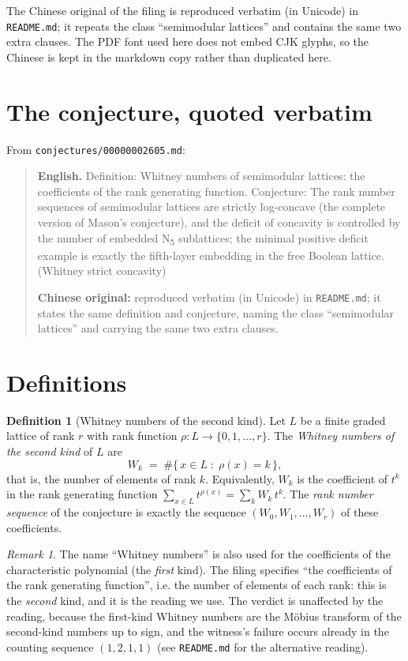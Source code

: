 \documentclass[11pt]{article}
\theoremstyle{definition}
\newtheorem{definition}[theorem]{Definition}
\theoremstyle{remark}
\newtheorem{remark}[theorem]{Remark}
\begin{document}
The Chinese original of the filing is reproduced verbatim (in Unicode) in
\texttt{README.md}; it repeats the class ``semimodular lattices'' and contains
the same two extra clauses. The PDF font used here does not embed CJK glyphs,
so the Chinese is kept in the markdown copy rather than duplicated here.

\section{The conjecture, quoted verbatim}

From \texttt{conjectures/00000002605.md}:

\begin{quote}
\textbf{English.} Definition: Whitney numbers of semimodular lattices: the
coefficients of the rank generating function. Conjecture: The rank number
sequences of semimodular lattices are strictly log-concave (the complete version
of Mason's conjecture), and the deficit of concavity is controlled by the number
of embedded N\textsubscript{5} sublattices; the minimal positive deficit example
is exactly the fifth-layer embedding in the free Boolean lattice.
(Whitney strict concavity)

\textbf{Chinese original:} reproduced verbatim (in Unicode) in
\texttt{README.md}; it states the same definition and conjecture, naming the
class ``semimodular lattices'' and carrying the same two extra clauses.
\end{quote}

\section{Definitions}

\begin{definition}[Whitney numbers of the second kind]\label{def:whitney}
Let $L$ be a finite graded lattice of rank $r$ with rank function
$\rho\colon L \to \{0,1,\dots,r\}$. The \emph{Whitney numbers of the second
kind} of $L$ are
\[
W_k \;=\; \#\{\, x \in L \;:\; \rho(x) = k \,\},
\]
that is, the number of elements of rank $k$. Equivalently, $W_k$ is the
coefficient of $t^k$ in the rank generating function
$\sum_{x\in L} t^{\rho(x)} = \sum_{k} W_k\, t^k$. The \emph{rank number
sequence} of the conjecture is exactly the sequence $(W_0,W_1,\dots,W_r)$ of
these coefficients.
\end{definition}

\begin{remark}
The name ``Whitney numbers'' is also used for the coefficients of the
characteristic polynomial (the \emph{first} kind). The filing specifies
``the coefficients of the rank generating function'', i.e. the number of
elements of each rank: this is the \emph{second} kind, and it is the reading we
use. The verdict is unaffected by the reading, because the first-kind Whitney
numbers are the M\"obius transform of the second-kind numbers up to sign, and the
witness's failure occurs already in the counting sequence
$(1,2,1,1)$ (see \texttt{README.md} for the alternative reading).
\end{remark}
\end{document}
